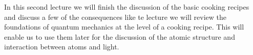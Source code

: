 In this second lecture we will finish the discussion of the basic cooking recipes and discuss a few of the consequences like te lecture we will review the foundations of quantum mechanics at the level of a cooking recipe. This will enable us to use them later for the discussion of the atomic structure and interaction between atoms and light.